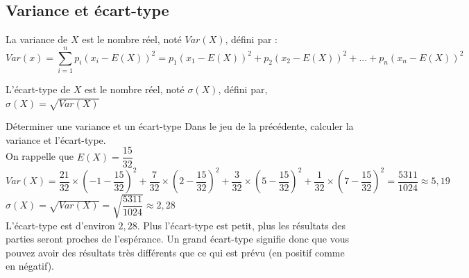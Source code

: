 \subsection{Variance et écart-type}

\begin{bdefis}

    \begin{itemDef}
        \item La variance de $X$ est le nombre réel, noté $Var(X)$, défini par :\\
        $$Var(x) = \sum_{i=1}^{n} p_i(x_i-E(X))^2 = p_1(x_1-E(X))^2 + p_2(x_2-E(X))^2 + ... + p_n(x_n-E(X))^2$$
        \item L'écart-type de $X$ est le nombre réel, noté $\sigma(X)$, défini par, $\sigma(X)=\sqrt{Var(X)}$\\
    \end{itemDef}
\end{bdefis}

\begin{bmethodet}{Déterminer une variance et un écart-type}
    Dans le jeu de la  précédente, calculer la variance et l'écart-type.\\
    On rappelle que $E(X) =\dfrac{15}{32}$\\
    $Var(X) = \dfrac{21}{32} \times (-1-\dfrac{15}{32})^2+ \dfrac{7}{32} \times (2-\dfrac{15}{32})^2+ \dfrac{3}{32} \times (5-\dfrac{15}{32})^2+\dfrac{1}{32} \times (7-\dfrac{15}{32})^2=\dfrac{5311}{1024}\approx 5,19$\\
	$\sigma(X)=\sqrt{Var(X)}=\sqrt{\dfrac{5311}{1024}}\approx 2,28$\\
    L'écart-type est d'environ $2,28$. Plus l'écart-type est petit, plus les résultats des parties seront proches de l'espérance. Un grand écart-type signifie donc que vous pouvez avoir des résultats très différents que ce qui est prévu (en positif comme en négatif).
\end{bmethodet}